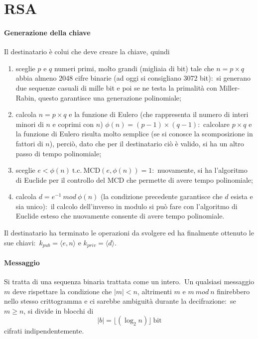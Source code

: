 \chapter{RSA}

\subsubsection{Generazione della chiave}

Il destinatario è colui che deve creare la chiave, quindi

\begin{enumerate}
    \item sceglie $p$ e $q$ numeri primi, molto grandi (migliaia di bit) tale che $n = p \times q$ abbia almeno 2048 cifre binarie (ad oggi si consigliano 3072 bit):\ si generano due sequenze casuali di mille bit e poi se ne testa la primalità con Miller-Rabin, questo garantisce una generazione polinomiale;
    \item calcola $n = p \times q$ e la funzione di Eulero (che rappresenta il numero di interi minori di $n$ e coprimi con $n$) $\phi(n) = (p - 1) \times (q - 1)$:\ calcolare $p \times q$ e la funzione di Eulero risulta molto semplice (se si conosce la scomposizione in fattori di $n$), perciò, dato che per il destinatario ciò è valido, si ha un altro passo di tempo polinomiale;
    \item sceglie $e < \phi(n)\ \mathrm{t.c.\ MCD}(e, \phi(n)) = 1$:\ nuovamente, si ha l'algoritmo di Euclide per il controllo del MCD che permette di avere tempo polinomiale;
    \item calcola $d = e^{-1}\ \mathit{mod}\ \phi(n)$ (la condizione precedente garantisce che $d$ esista e sia unico):\ il calcolo dell'inverso in modulo si può fare con l'algoritmo di Euclide esteso che nuovamente consente di avere tempo polinomiale.
\end{enumerate}

\noindent Il destinatario ha terminato le operazioni da svolgere ed ha finalmente ottenuto le sue chiavi:\ $k_{\mathit{pub}} = \langle e, n\rangle$ e $k_{\mathit{priv}} = \langle d\rangle$.\

\subsubsection{Messaggio}

Si tratta di una sequenza binaria trattata come un intero.\
Un qualsiasi messaggio $m$ deve rispettare la condizione che $|m| < n$, altrimenti $m$ e $m\ \mathit{mod}\ n$ finirebbero nello stesso crittogramma e ci sarebbe ambiguità durante la decifrazione:\ se $m \geq n$, si divide in blocchi di
\[|b| = \lfloor(\log_2 n)\rfloor\ \mathrm{bit}\]
cifrati indipendentemente.\

